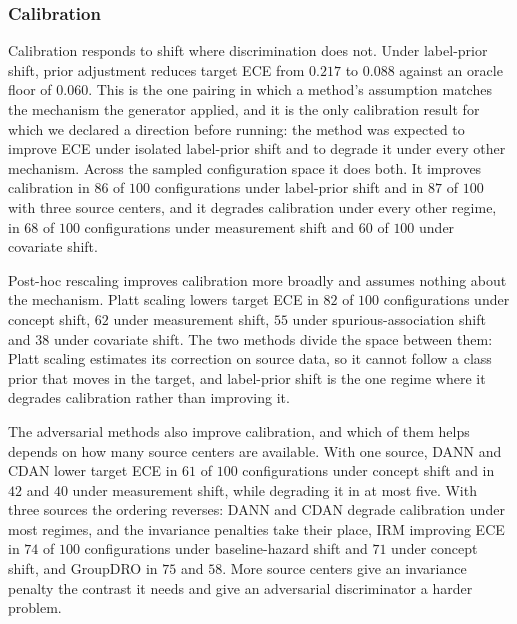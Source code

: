 
\subsubsection{Calibration}
Calibration responds to shift where discrimination does not. Under label-prior
shift, prior adjustment reduces target ECE from $0.217$ to $0.088$ against an
oracle floor of $0.060$. This is the one pairing in which a method's assumption
matches the mechanism the generator applied, and it is the only calibration
result for which we declared a direction before running: the method was expected
to improve ECE under isolated label-prior shift and to degrade it under every
other mechanism. Across the sampled configuration space it does both. It
improves calibration in $86$ of $100$ configurations under label-prior shift and
in $87$ of $100$ with three source centers, and it degrades calibration under
every other regime, in $68$ of $100$ configurations under measurement shift and
$60$ of $100$ under covariate shift.

Post-hoc rescaling improves calibration more broadly and assumes nothing about
the mechanism. Platt scaling lowers target ECE in $82$ of $100$ configurations
under concept shift, $62$ under measurement shift, $55$ under
spurious-association shift and $38$ under covariate shift. The two methods
divide the space between them: Platt scaling estimates its correction on source
data, so it cannot follow a class prior that moves in the target, and
label-prior shift is the one regime where it degrades calibration rather than
improving it.

The adversarial methods also improve calibration, and which of them helps
depends on how many source centers are available. With one source, DANN and
CDAN lower target ECE in $61$ of $100$ configurations under concept shift and in
$42$ and $40$ under measurement shift, while degrading it in at most five. With
three sources the ordering reverses: DANN and CDAN degrade calibration under
most regimes, and the invariance penalties take their place, IRM improving ECE
in $74$ of $100$ configurations under baseline-hazard shift and $71$ under
concept shift, and GroupDRO in $75$ and $58$. More source centers give an
invariance penalty the contrast it needs and give an adversarial discriminator
a harder problem.

